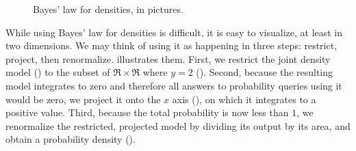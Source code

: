 \begin{figure}[tbp]
\tab
{}
\caption[Bayes' law for densities, in pictures]{Bayes' law for densities, in pictures.}
\label{fig:bayes-densities}
\end{figure}

While using Bayes' law for densities is difficult, it is easy to visualize, at least in two dimensions.
We may think of using it as happening in three steps: restrict, project, then renormalize.
 illustrates them.
First, we restrict the joint density model () to the subset of $\Re \times \Re$ where $y = 2$ ().
Second, because the resulting model integrates to zero and therefore all answers to probability queries using it would be zero, we project it onto the $x$ axis (), on which it integrates to a positive value.
Third, because the total probability is now less than $1$, we renormalize the restricted, projected model by dividing its output by its area, and obtain a probability density ().

